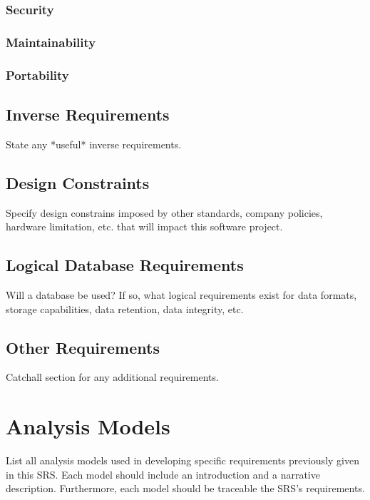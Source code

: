 \documentclass{scrreprt}
\begin{document}
		\subsection{Security}

		\subsection{Maintainability}

		\subsection{Portability}

		\section{Inverse Requirements}

State any *useful* inverse requirements.

	\section{Design Constraints}

Specify design constrains imposed by other standards, company policies, hardware limitation, etc. that will impact this software project.

	\section{Logical Database Requirements}

Will a database be used?  If so, what logical requirements exist for data formats, storage capabilities, data retention, data integrity, etc.

	\section{Other Requirements}

Catchall section for any additional requirements.

\chapter{Analysis Models}

List all analysis models used in developing specific requirements previously given in this SRS.  Each model should include an introduction and a narrative description.  Furthermore, each model should be traceable the SRS’s requirements.
\end{document}
